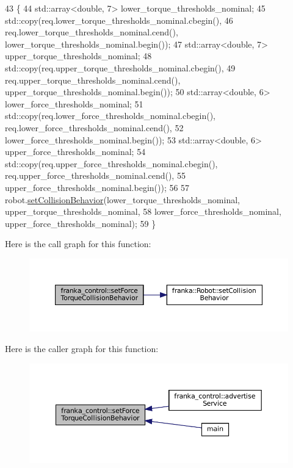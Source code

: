 \begin{DoxyCode}
43   \{
44   std::array<double, 7> lower\_torque\_thresholds\_nominal;
45   std::copy(req.lower\_torque\_thresholds\_nominal.cbegin(),
46             req.lower\_torque\_thresholds\_nominal.cend(), lower\_torque\_thresholds\_nominal.begin());
47   std::array<double, 7> upper\_torque\_thresholds\_nominal;
48   std::copy(req.upper\_torque\_thresholds\_nominal.cbegin(),
49             req.upper\_torque\_thresholds\_nominal.cend(), upper\_torque\_thresholds\_nominal.begin());
50   std::array<double, 6> lower\_force\_thresholds\_nominal;
51   std::copy(req.lower\_force\_thresholds\_nominal.cbegin(), req.lower\_force\_thresholds\_nominal.cend(),
52             lower\_force\_thresholds\_nominal.begin());
53   std::array<double, 6> upper\_force\_thresholds\_nominal;
54   std::copy(req.upper\_force\_thresholds\_nominal.cbegin(), req.upper\_force\_thresholds\_nominal.cend(),
55             upper\_force\_thresholds\_nominal.begin());
56 
57   robot.\hyperlink{classfranka_1_1Robot_a168e1214ac36d74ac64f894332b84534}{setCollisionBehavior}(lower\_torque\_thresholds\_nominal, 
      upper\_torque\_thresholds\_nominal,
58                              lower\_force\_thresholds\_nominal, upper\_force\_thresholds\_nominal);
59 \}
\end{DoxyCode}
Here is the call graph for this function\+:
\nopagebreak
\begin{figure}[H]
\begin{center}
\leavevmode
\includegraphics[width=350pt]{namespacefranka__control_a7ea982d94110cc6f522d42a140d608af_cgraph}
\end{center}
\end{figure}
Here is the caller graph for this function\+:
\nopagebreak
\begin{figure}[H]
\begin{center}
\leavevmode
\includegraphics[width=350pt]{namespacefranka__control_a7ea982d94110cc6f522d42a140d608af_icgraph}
\end{center}
\end{figure}
\mbox{\label{namespacefranka__control_a13e02b7048c013bf57506f927ce6745d}} 
